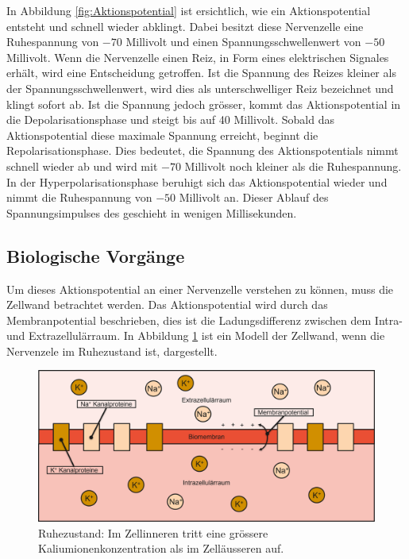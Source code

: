 \begin{refsection}
In Abbildung \ref{fig:Aktionspotential} ist ersichtlich, wie ein Aktionspotential entsteht und schnell wieder abklingt.
Dabei besitzt diese Nervenzelle eine Ruhespannung von $-70$ Millivolt und einen Spannungsschwellenwert von $-50$ Millivolt.
Wenn die Nervenzelle einen Reiz, in Form eines elektrischen Signales erhält, wird eine Entscheidung getroffen. 
Ist die Spannung des Reizes kleiner als der Spannungsschwellenwert, wird dies als unterschwelliger Reiz bezeichnet und klingt sofort ab.
Ist die Spannung jedoch grösser, kommt das Aktionspotential in die Depolarisationsphase und steigt bis auf 40 Millivolt.
Sobald das Aktionspotential diese maximale Spannung erreicht, beginnt die Repolarisationsphase.
Dies bedeutet, die Spannung des Aktionspotentials nimmt schnell wieder ab und wird mit $-70$ Millivolt noch kleiner als die Ruhespannung.
In der Hyperpolarisationsphase beruhigt sich das Aktionspotential wieder und nimmt die Ruhespannung von $-50$ Millivolt an.
Dieser Ablauf des Spannungsimpulses des geschieht in wenigen Millisekunden.
\cite{nerven:InaLammers.31.08.2015}

\subsection{Biologische Vorgänge}
Um dieses Aktionspotential an einer Nervenzelle verstehen zu können, muss die Zellwand betrachtet werden. 
Das Aktionspotential wird durch das Membranpotential beschrieben, dies ist die Ladungsdifferenz zwischen dem Intra- und
Extrazellulärraum.
In Abbildung \ref{fig:Ruhezustand} ist ein Modell der Zellwand, wenn die Nervenzele im Ruhezustand ist, dargestellt.
\begin{figure}[h]
    \centering
    \includegraphics[width=\textwidth]{papers/nerven/Bilder/Vorgang1.png}
    \caption{Ruhezustand: Im Zellinneren tritt eine grössere Kaliumionenkonzentration als im Zelläusseren auf.}
    \label{fig:Ruhezustand}
\end{figure}


\end{refsection}
